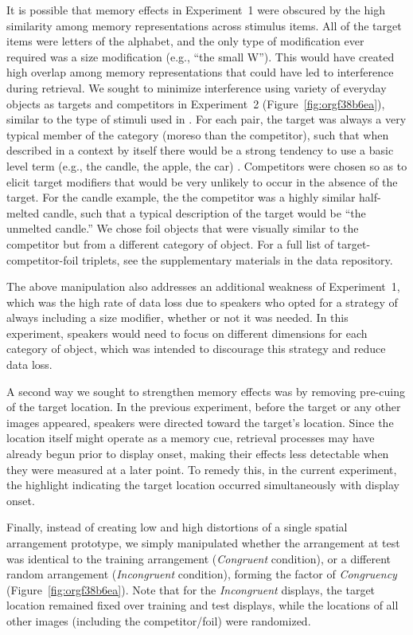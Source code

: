 \documentclass[natbib,man,a4paper]{apa6}
\begin{document}
It is possible that memory effects in Experiment~1 were obscured by the high similarity among memory representations across stimulus items. All of the target items were letters of the alphabet, and the only type of modification ever required was a size modification (e.g., ``the small W''). This would have created high overlap among memory representations that could have led to interference during retrieval. We sought to minimize interference using variety of everyday objects as targets and competitors in Experiment~2 (Figure~\ref{fig:orgf38b6ea}), similar to the type of stimuli used in \cite{GannBarr2014}. For each pair, the target was always a very typical member of the category (moreso than the competitor), such that when described in a context by itself there would be a strong tendency to use a basic level term (e.g., the candle, the apple, the car) \citep{roschetal76}. Competitors were chosen so as to elicit target modifiers that would be very unlikely to occur in the absence of the target. For the candle example, the the competitor was a highly similar half-melted candle, such that a typical description of the target would be ``the unmelted candle.''  We chose foil objects that were visually similar to the competitor but from a different category of object. For a full list of target-competitor-foil triplets, see the supplementary materials in the data repository.

The above manipulation also addresses an additional weakness of Experiment~1, which was the high rate of data loss due to speakers who opted for a strategy of always including a size modifier, whether or not it was needed. In this experiment, speakers would need to focus on different dimensions for each category of object, which was intended to discourage this strategy and reduce data loss.

A second way we sought to strengthen memory effects was by removing pre-cuing of the target location. In the previous experiment, before the target or any other images appeared, speakers were directed toward the target's location. Since the location itself might operate as a memory cue, retrieval processes may have already begun prior to display onset, making their effects less detectable when they were measured at a later point.  To remedy this, in the current experiment, the highlight indicating the target location occurred simultaneously with display onset.

Finally, instead of creating low and high distortions of a single spatial arrangement prototype, we simply manipulated whether the arrangement at test was identical to the training arrangement (\emph{Congruent} condition), or a different random arrangement (\emph{Incongruent} condition), forming the factor of \emph{Congruency} (Figure~\ref{fig:orgf38b6ea}). Note that for the \emph{Incongruent} displays, the target location remained fixed over training and test displays, while the locations of all other images (including the competitor/foil) were randomized.
\end{document}
